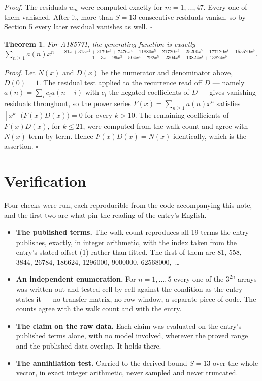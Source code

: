 \documentclass[11pt]{article}
\newtheorem{theorem}{Theorem}
\theoremstyle{definition}
\begin{document}
{\itshape Proof.} The residuals $u_m$ were computed exactly for $m = 1,\dots,47$. Every one of them vanished. After it, more than $S = 13$ consecutive residuals vanish, so by Section 5 every later residual vanishes as well. $\square$

\begin{theorem} For A185771, the generating function is exactly $\sum_{n\ge 1} a(n)x^n = \frac{81x + 315x^{2} + 2170x^{3} + 7476x^{4} + 11880x^{5} + 21720x^{6} - 25200x^{7} - 177120x^{8} - 155520x^{9}}{1 - 3x - 96x^{3} - 504x^{4} - 792x^{5} - 2304x^{6} + 13824x^{8} + 13824x^{9}}$.\end{theorem}

{\itshape Proof.} Let $N(x)$ and $D(x)$ be the numerator and denominator above, $D(0)=1$. The residual test applied to the recurrence read off $D$ --- namely $a(n) = \sum_i c_i a(n-i)$ with $c_i$ the negated coefficients of $D$ --- gives vanishing residuals throughout, so the power series $F(x)=\sum_{n\ge 1}a(n)x^n$ satisfies $[x^k]\bigl(F(x)D(x)\bigr) = 0$ for every $k > 10$. The remaining coefficients of $F(x)D(x)$, for $k \le 21$, were computed from the walk count and agree with $N(x)$ term by term. Hence $F(x)D(x) = N(x)$ identically, which is the assertion. $\square$

\section{Verification}

Four checks were run, each reproducible from the code accompanying this note, and the first two are what pin the reading of the entry's English.

\begin{itemize}

\item {\bfseries The published terms.} The walk count reproduces all 19 terms the entry publishes, exactly, in integer arithmetic, with the index taken from the entry's stated offset (1) rather than fitted. The first of them are 81, 558, 3844, 26784, 186624, 1296000, 9000000, 62568000,~\dots

\item {\bfseries An independent enumeration.} For $n = 1,\dots,5$ every one of the $3^{2n}$ arrays was written out and tested cell by cell against the condition as the entry states it --- no transfer matrix, no row window, a separate piece of code. The counts agree with the walk count and with the entry.

\item {\bfseries The claim on the raw data.} Each claim was evaluated on the entry's published terms alone, with no model involved, wherever the proved range and the published data overlap. It holds there.

\item {\bfseries The annihilation test.} Carried to the derived bound $S = 13$ over the whole vector, in exact integer arithmetic, never sampled and never truncated.

\end{itemize}
\end{document}
